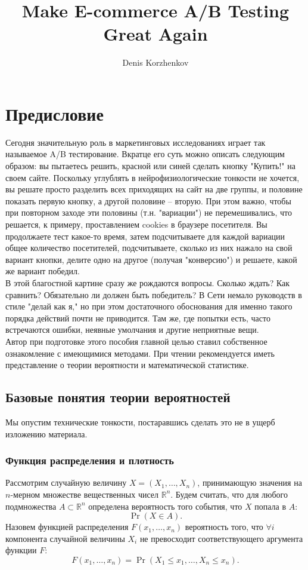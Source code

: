 \documentclass[12pt,a4paper]{book}
\author{Denis Korzhenkov}
\title{Make E-commerce A/B Testing Great Again}
\begin{document}
\section{Предисловие}
Сегодня значительную роль в маркетинговых исследованиях играет так называемое A/B тестирование. Вкратце его суть можно описать следующим образом: вы пытаетесь решить, красной или синей сделать кнопку "Купить!" на своем сайте. Поскольку углублять в нейрофизиологические тонкости не хочется, вы решате просто разделить всех приходящих на сайт на две группы, и половине показать первую кнопку, а другой половине -- вторую. При этом важно, чтобы при повторном заходе эти половины (т.н. "вариации") не перемешивались, что решается, к примеру, проставлением cookies в браузере посетителя. Вы продолжаете тест какое-то время, затем подсчитываете для каждой вариации общее количество посетителей, подсчитываете, сколько из них нажало на свой вариант кнопки, делите одно на другое (получая "конверсию") и решаете, какой же вариант победил. \\
В этой благостной картине сразу же рождаются вопросы. Сколько ждать? Как сравнить? Обязательно ли должен быть победитель? В Сети немало руководств в стиле "делай как я," но при этом достаточного обоснования для именно такого порядка действий почти не приводится. Там же, где попытки есть, часто встречаются ошибки, неявные умолчания и другие неприятные вещи.\\
Автор при подготовке этого пособия главной целью ставил собственное ознакомление с имеющимися методами. При чтении рекомендуется иметь представление о теории вероятности и математической статистике.
\subsection{Базовые понятия теории вероятностей}
Мы опустим технические тонкости, постаравшись сделать это не в ущерб изложению материала.\\
\subsubsection{Функция распределения и плотность}
Рассмотрим случайную величину $X = \left(X_1, \dots, X_n \right)$, принимающую значения на $n$-мерном множестве вещественных чисел $\mathbb{R}^n$. Будем считать, что для любого подмножества $A \subset \mathbb{R}^n$ определена вероятность того события, что $X$ попала в $A$: $$\Pr\left(X \in A \right).$$
Назовем функцией распределения $F\left(x_1, \dots, x_n\right)$ вероятность того, что $\forall i$ компонента случайной величины $X_i$ не превосходит соответствующего аргумента функции $F$:
$$ F\left(x_1, \dots, x_n\right) = \Pr\left(X_1 \leq x_1, \dots, X_n \leq x_n\right).$$
\end{document}
